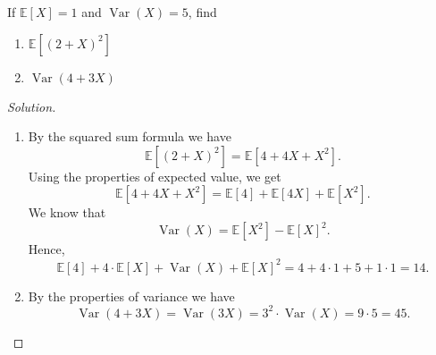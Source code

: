 \documentclass{article}[12pt]
\newenvironment{solution}
  {\renewcommand\qedsymbol{$\blacksquare$}\begin{proof}[Solution]}
  {\end{proof}}
\newenvironment{problem}[1]
  {\renewcommand\theinnercustomprblm{#1}\innercustomprblm}
  {\endinnercustomprblm}
\DeclareMathOperator{\Var}{Var}
\newcommand{\E}{\mathbb{E}}
\begin{document}
\begin{problem}{4.38}\normalfont
If $\E[X] = 1$ and $\Var(X) = 5$, find
\begin{enumerate}[label=(\alph*)]
    \item $\E[(2 + X)^{2}]$
    \item $\Var(4 + 3X)$
\end{enumerate}
\end{problem}
\begin{solution}
\quad
\begin{enumerate}[label=(\alph*)]
    \item By the squared sum formula we have
    \begin{equation*}
        \E\left[(2 + X)^{2}\right] = \E\left[4 + 4X + X^{2}\right].
    \end{equation*}
    Using the properties of expected value, we get
    \begin{equation*}
        \E\left[4 + 4X + X^{2}\right] = \E[4] + \E[4X] + \E\left[X^{2}\right].
    \end{equation*}
    We know that
    \begin{equation*}
        \Var(X) = \E\left[X^{2}\right] - \E\left[X\right]^{2}.
    \end{equation*}
    Hence,
    \begin{equation*}
        \E[4] + 4\cdot\E[X] + \Var(X) + \E[X]^{2} = 4 + 4\cdot 1 + 5 + 1\cdot 1 = 14.
    \end{equation*}
    
    \item By the properties of variance we have
    \begin{equation*}
        \Var(4 + 3X) = \Var(3X) = 3^{2}\cdot\Var(X) = 9\cdot 5 = 45.
    \end{equation*}
\end{enumerate}
\end{solution}
\end{document}
